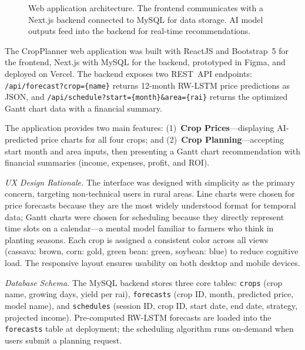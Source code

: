 \documentclass[journal]{IEEEtran}
\begin{document}
\begin{figure}[htbp]
{}%
  \caption{Web application architecture. The frontend communicates with a Next.js backend connected to MySQL for data storage. AI model outputs feed into the backend for real-time recommendations.}
  \label{fig:webapp}
\end{figure}

The CropPlanner web application was built with ReactJS and Bootstrap~5 for the frontend, Next.js with MySQL for the backend, prototyped in Figma, and deployed on Vercel. The backend exposes two REST~API endpoints: \texttt{/api/forecast?crop=\{name\}} returns 12-month RW-LSTM price predictions as JSON, and \texttt{/api/schedule?start=\{month\}\&area=\{rai\}} returns the optimized Gantt chart data with a financial summary.

The application provides two main features: (1)~\textbf{Crop Prices}---displaying AI-predicted price charts for all four crops; and (2)~\textbf{Crop Planning}---accepting start month and area inputs, then presenting a Gantt chart recommendation with financial summaries (income, expenses, profit, and ROI).

\textit{UX Design Rationale.} The interface was designed with simplicity as the primary concern, targeting non-technical users in rural areas. Line charts were chosen for price forecasts because they are the most widely understood format for temporal data; Gantt charts were chosen for scheduling because they directly represent time slots on a calendar---a mental model familiar to farmers who think in planting seasons. Each crop is assigned a consistent color across all views (cassava: brown, corn: gold, green bean: green, soybean: blue) to reduce cognitive load. The responsive layout ensures usability on both desktop and mobile devices.

\textit{Database Schema.} The MySQL backend stores three core tables: \texttt{crops} (crop name, growing days, yield per rai), \texttt{forecasts} (crop ID, month, predicted price, model name), and \texttt{schedules} (session ID, crop ID, start date, end date, strategy, projected income). Pre-computed RW-LSTM forecasts are loaded into the \texttt{forecasts} table at deployment; the scheduling algorithm runs on-demand when users submit a planning request.
\end{document}

